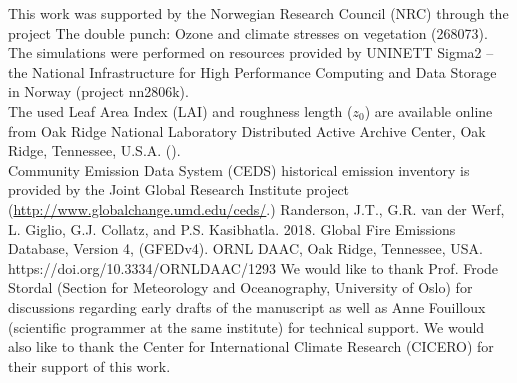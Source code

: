 \documentclass[gmd, manuscript]{copernicus}
\begin{document}








\begin{acknowledgements}
  This work was supported by the Norwegian Research Council (NRC) through the project The double punch: Ozone and climate stresses on vegetation (268073).\\
  The simulations were performed on resources provided by UNINETT Sigma2 -- the National Infrastructure for High Performance Computing and Data Storage in Norway (project nn2806k).\\
  The used Leaf Area Index (LAI) and roughness length ($z_0$) are available online from Oak Ridge National Laboratory Distributed Active Archive Center, Oak Ridge, Tennessee, U.S.A. ().\\
  Community Emission Data System (CEDS) historical emission inventory is provided by the Joint Global Research Institute project (\url{http://www.globalchange.umd.edu/ceds/}.)
  Randerson, J.T., G.R. van der Werf, L. Giglio, G.J. Collatz, and P.S. Kasibhatla. 2018. Global Fire Emissions Database, Version 4, (GFEDv4). ORNL DAAC, Oak Ridge, Tennessee, USA. https://doi.org/10.3334/ORNLDAAC/1293
  We would like to thank Prof. Frode Stordal (Section for Meteorology and Oceanography, University of Oslo) for discussions regarding early drafts of the manuscript as well as Anne Fouilloux (scientific programmer at the same institute) for technical support.
  We would also like to thank the Center for International Climate Research (CICERO) for their support of this work.
\end{acknowledgements}
\end{document}
